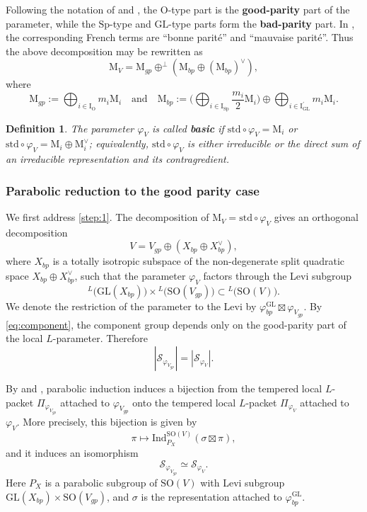 \documentclass[12pt]{amsart}
\numberwithin{equation}{subsection}
\newcommand{\CS}{{\mathcal {S}}}
\newcommand{\RI}{{\mathrm {I}}}
\newcommand{\RM}{{\mathrm {M}}}
\newcommand{\RO}{{\mathrm {O}}}
\newcommand{\GL}{{\mathrm{GL}}}
\newcommand{\Ind}{{\mathrm{Ind}}}
\newcommand{\SO}{{\mathrm{SO}}}
\newcommand{\Sp}{{\mathrm{Sp}}}
\def\sig{{\sigma}}
\def\std{\mathrm{std}}
\def\vphi{\varphi}
\def\p{\prime}
\def\SO{\mathrm{SO}}
\newtheorem{defin}[thm]{Definition}
\begin{document}
Following the notation of \cite[\S 4.1]{moeglin2020paquets} and
\cite[\S 6]{renard2024generic}, the $\RO$-type part is the
\textbf{good-parity} part of the parameter, while the $\Sp$-type and
$\GL$-type parts form the \textbf{bad-parity} part. In
\cite[\S~4.1]{moeglin2020paquets}, the corresponding French terms are
``bonne parité'' and ``mauvaise parité''. Thus the above decomposition may be
rewritten as
\[
\RM_V=\RM_{gp}\oplus^{\perp} (\RM_{bp}\oplus (\RM_{bp})^{\vee}),
\]
where
\[
\RM_{gp}:=\bigoplus_{i\in\RI_{\RO}}m_i\RM_i
\quad\text{and}\quad
\RM_{bp}:=
\bigg(\bigoplus_{i\in \RI_{\Sp}}\frac{m_i}{2}\RM_i\bigg)
\oplus
\bigoplus_{i\in\RI^\p_{\GL}}m_i\RM_i.
\]

\begin{defin}\label{defin:basic_type}
The parameter $\varphi_V$ is called \textbf{basic} if
$\std\circ \varphi_V=\RM_i$ or
$\std\circ\varphi_V=\RM_i\oplus \RM_i^{\vee}$; equivalently,
$\std\circ \vphi_V$ is either irreducible or the direct sum of an irreducible
representation and its contragredient.
\end{defin}

\subsubsection{Parabolic reduction to the good parity case}

We first address \eqref{step:1}. The decomposition of
$\RM_V = \std\circ \vphi_V$ gives an orthogonal decomposition
\[
V=V_{gp}\oplus(X_{bp}\oplus X^\vee_{bp}),
\]
where $X_{bp}$ is a totally isotropic subspace of the non-degenerate split
quadratic space $X_{bp}\oplus X^\vee_{bp}$, such that the parameter $\vphi_V$
factors through the Levi subgroup
\[
{}^L\big(\GL(X_{bp})\big)\times {}^L\big( \SO(V_{gp}) \big)\subset {}^L\big( \SO(V) \big).
\]
We denote the restriction of the parameter to the Levi by
$\vphi^\GL_{bp}\boxtimes \vphi_{V_{gp}}$. By \eqref{eq:component}, the
component group depends only on the good-parity part of the local
$L$-parameter. Therefore
\[
|\CS_{\vphi_{V_{gp}}}| = |\CS_{\vphi_V}|.
\]

By \cite[Th\'eor\`eme 4.4]{moeglin2020paquets} and
\cite[\S 6]{renard2024generic}, parabolic induction induces a bijection from
the tempered local $L$-packet $\Pi_{\vphi_{V_{gp}}}$ attached to
$\vphi_{V_{gp}}$ onto the tempered local $L$-packet $\Pi_{\vphi_{V}}$ attached
to $\vphi_{V}$. More precisely, this bijection is given by
\[
\pi\mapsto \Ind_{P_X}^{\SO(V)}(\sig\boxtimes \pi),
\]
and it induces an isomorphism
\[
\CS_{\vphi_{V_{gp}}}\simeq \CS_{\vphi_V}.
\]
Here $P_X$ is a parabolic subgroup of $\SO(V)$ with Levi subgroup $\GL(X_{bp})\times \SO(V_{gp})$, and $\sig$ is the representation attached to $\vphi^\GL_{bp}$.
\end{document}
